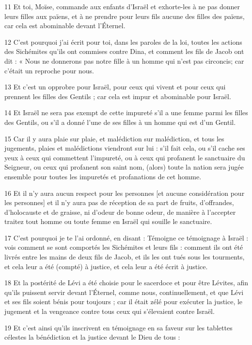 \par 11 Et toi, Moïse, commande aux enfants d'Israël et exhorte-les à ne pas donner leurs filles aux païens, et à ne prendre pour leurs fils aucune des filles des païens, car cela est abominable devant l'Éternel.
\par 12 C'est pourquoi j'ai écrit pour toi, dans les paroles de la loi, toutes les actions des Sichémites qu'ils ont commises contre Dina, et comment les fils de Jacob ont dit : « Nous ne donnerons pas notre fille à un homme qui n'est pas circoncis; car c'était un reproche pour nous.
\par 13 Et c'est un opprobre pour Israël, pour ceux qui vivent et pour ceux qui prennent les filles des Gentils ; car cela est impur et abominable pour Israël.
\par 14 Et Israël ne sera pas exempt de cette impureté s'il a une femme parmi les filles des Gentils, ou s'il a donné l'une de ses filles à un homme qui est d'un Gentil.
\par 15 Car il y aura plaie sur plaie, et malédiction sur malédiction, et tous les jugements, plaies et malédictions viendront sur lui : s'il fait cela, ou s'il cache ses yeux à ceux qui commettent l'impureté, ou à ceux qui profanent le sanctuaire du Seigneur, ou ceux qui profanent son saint nom, (alors) toute la nation sera jugée ensemble pour toutes les impuretés et profanations de cet homme.
\par 16 Et il n'y aura aucun respect pour les personnes [et aucune considération pour les personnes] et il n'y aura pas de réception de sa part de fruits, d'offrandes, d'holocauste et de graisse, ni d'odeur de bonne odeur, de manière à l'accepter traitez tout homme ou toute femme en Israël qui souille le sanctuaire.
\par 17 C'est pourquoi je te l'ai ordonné, en disant : Témoigne ce témoignage à Israël : vois comment se sont comportés les Sichémites et leurs fils : comment ils ont été livrés entre les mains de deux fils de Jacob, et ils les ont tués sous les tourments, et cela leur a été (compté) à justice, et cela leur a été écrit à justice.
\par 18 Et la postérité de Lévi a été choisie pour le sacerdoce et pour être Lévites, afin qu'ils puissent servir devant l'Éternel, comme nous, continuellement, et que Lévi et ses fils soient bénis pour toujours ; car il était zélé pour exécuter la justice, le jugement et la vengeance contre tous ceux qui s'élevaient contre Israël.
\par 19 Et c'est ainsi qu'ils inscrivent en témoignage en sa faveur sur les tablettes célestes la bénédiction et la justice devant le Dieu de tous :
